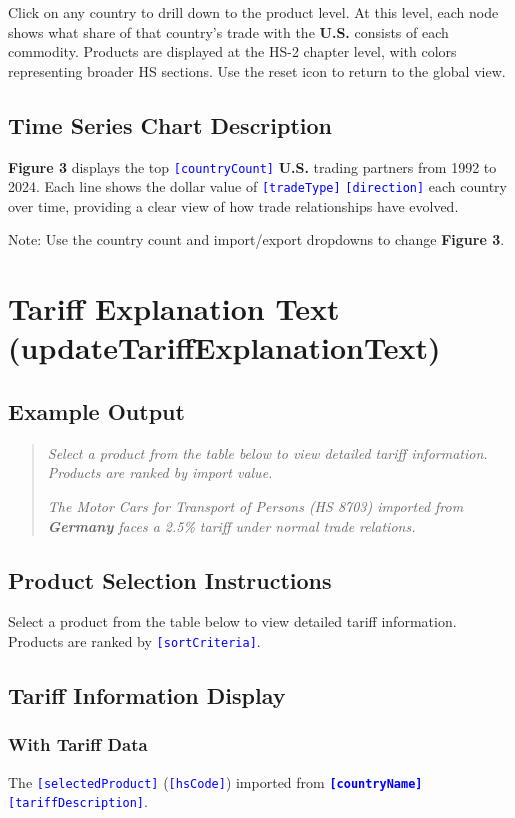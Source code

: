 \documentclass[12pt]{article}
\newcommand{\var}[1]{\textcolor{blue}{\texttt{[#1]}}}
\newcommand{\bold}[1]{\textbf{#1}}
\begin{document}
Click on any country to drill down to the product level. At this level, each node shows what share of that country's trade with the \bold{U.S.} consists of each commodity. Products are displayed at the HS-2 chapter level, with colors representing broader HS sections. Use the reset icon to return to the global view.

\subsection{Time Series Chart Description}
\bold{Figure 3} displays the top \var{countryCount} \bold{U.S.} trading partners from 1992 to 2024. Each line shows the dollar value of \var{tradeType} \var{direction} each country over time, providing a clear view of how trade relationships have evolved.

Note: Use the country count and import/export dropdowns to change \bold{Figure 3}.

\section{Tariff Explanation Text (updateTariffExplanationText)}

\subsection{Example Output}
\begin{quote}
\textit{Select a product from the table below to view detailed tariff information. Products are ranked by import value.}

\textit{The Motor Cars for Transport of Persons (HS 8703) imported from \textbf{Germany} faces a 2.5\% tariff under normal trade relations.}
\end{quote}

\subsection{Product Selection Instructions}
Select a product from the table below to view detailed tariff information. Products are ranked by \var{sortCriteria}.

\subsection{Tariff Information Display}
\subsubsection{With Tariff Data}
The \var{selectedProduct} (\var{hsCode}) imported from \bold{\var{countryName}} \var{tariffDescription}.
\end{document}
